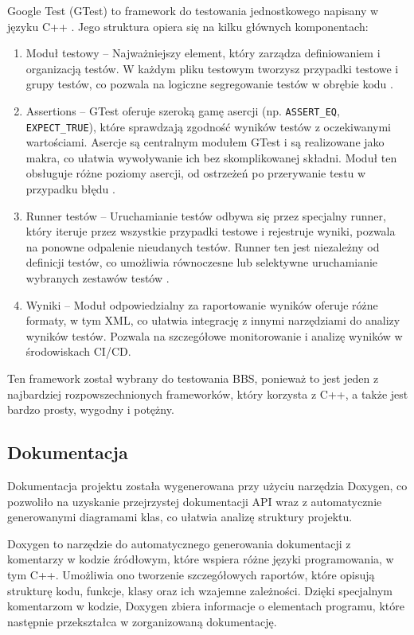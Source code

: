 Google Test (GTest) to framework do testowania jednostkowego napisany w języku C++ \cite{gtest}. Jego struktura opiera się na kilku głównych komponentach:

\begin{enumerate}
    \item Moduł testowy -- Najważniejszy element, który zarządza definiowaniem i organizacją testów. W każdym pliku testowym tworzysz przypadki testowe i grupy testów, co pozwala na logiczne segregowanie testów w obrębie kodu \cite{gtest_primer}.
    \item Assertions -- GTest oferuje szeroką gamę asercji (np. \texttt{ASSERT\_EQ}, \texttt{EXPECT\_TRUE}), które sprawdzają zgodność wyników testów z oczekiwanymi wartościami. Asercje są centralnym modułem GTest i są realizowane jako makra, co ułatwia wywoływanie ich bez skomplikowanej składni. Moduł ten obsługuje różne poziomy asercji, od ostrzeżeń po przerywanie testu w przypadku błędu \cite{gtest_primer}.
    \item Runner testów -- Uruchamianie testów odbywa się przez specjalny runner, który iteruje przez wszystkie przypadki testowe i rejestruje wyniki, pozwala na ponowne odpalenie nieudanych testów. Runner ten jest niezależny od definicji testów, co umożliwia równoczesne lub selektywne uruchamianie wybranych zestawów testów \cite{gtest}. 
    \item Wyniki -- Moduł odpowiedzialny za raportowanie wyników oferuje różne formaty, w tym XML, co ułatwia integrację z innymi narzędziami do analizy wyników testów. Pozwala na szczegółowe monitorowanie i analizę wyników w środowiskach CI/CD.
\end{enumerate}

Ten framework został wybrany do testowania BBS, ponieważ to jest jeden z najbardziej rozpowszechnionych frameworków, który korzysta z C++, a także jest bardzo prosty, wygodny i potężny.

\subsection{Dokumentacja}
Dokumentacja projektu została wygenerowana przy użyciu narzędzia Doxygen, co pozwoliło na uzyskanie przejrzystej dokumentacji API wraz z automatycznie generowanymi diagramami klas, co ułatwia analizę struktury projektu.

Doxygen to narzędzie do automatycznego generowania dokumentacji z komentarzy w kodzie źródłowym, które wspiera różne języki programowania, w tym C++. Umożliwia ono tworzenie szczegółowych raportów, które opisują strukturę kodu, funkcje, klasy oraz ich wzajemne zależności. Dzięki specjalnym komentarzom w kodzie, Doxygen zbiera informacje o elementach programu, które następnie przekształca w zorganizowaną dokumentację\cite{doxygen,doxygen_features}.

